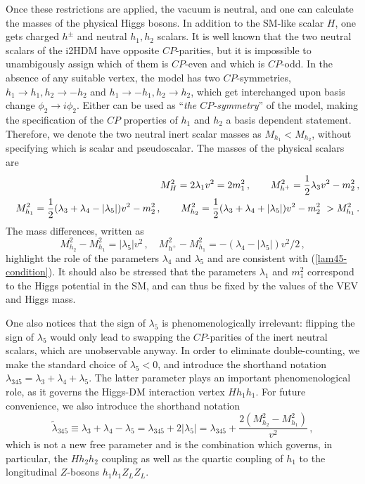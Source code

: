 \documentclass[12pt,a4paper]{article}
\begin{document}
Once these restrictions are applied, the vacuum is neutral, and one can calculate the masses of the physical Higgs bosons.
In addition to the SM-like scalar $H$, one gets charged $h^\pm$ and neutral $h_1, h_2$ scalars. 
It is well known that the two neutral scalars of the i2HDM have opposite $CP$-parities, but it is impossible 
to unambigously assign which of them is $CP$-even and which is $CP$-odd.
In the absence of any suitable vertex, the model has two $CP$-symmetries, $h_1 \to h_1, h_2 \to -h_2$ and
$h_1 \to -h_1, h_2 \to h_2$, which get interchanged upon basis change $\phi_2 \to i \phi_2$. 
Either can be used as ``\textit{the $CP$-symmetry}'' of the model, 
making the specification of the $CP$ properties of $h_1$ and $h_2$ a basis dependent statement. 
Therefore, we denote the two neutral inert scalar masses as $M_{h_1} < M_{h_2}$, without specifying which is scalar and pseudoscalar.
The masses of the physical scalars are 
\begin{eqnarray}
&&M_H^2 = 2 \lambda_1 v^2 = 2m_1^2\,,\qquad
M_{h^+}^2 = {1\over 2} \lambda_3 v^2 - m_2^2\,,\nonumber\\
&&M_{h_1}^2 = {1\over 2}(\lambda_3 +\lambda_4 - |\lambda_5|) v^2 - m_2^2\,,\qquad
M_{h_2}^2 = {1\over 2}(\lambda_3 +\lambda_4 + |\lambda_5|) v^2 - m_2^2 \ >M_{h_1}^2\,.\label{masses}
\end{eqnarray}
The mass differences, written as
\begin{equation}
M_{h_2}^2 - M_{h_1}^2 = |\lambda_5| v^2\,,\quad 
M_{h^+}^2 - M_{h_1}^2 = -(\lambda_4 - |\lambda_5|) v^2/2\,,
\end{equation}
highlight the role of the parameters $\lambda_4$ and $\lambda_5$ and are consistent with (\ref{lam45-condition}).
It should also be stressed that the parameters $\lambda_1$ and $m_1^2$ correspond to the Higgs potential in the SM, and can thus be fixed by the values of the VEV and Higgs mass.

One also notices that the sign of $\lambda_5$ is phenomenologically irrelevant: 
flipping the sign of $\lambda_5$ would only lead to swapping the $CP$-parities
of the inert neutral scalars, which are unobservable anyway.
In order to eliminate double-counting, we make the standard choice of $\lambda_5 < 0$,
and introduce the shorthand notation $\lambda_{345}=\lambda_3+\lambda_4+\lambda_5$.
The latter parameter plays an important phenomenological role, as it governs the Higgs-DM interaction vertex $H h_1 h_1$.
For future convenience, we also introduce the shorthand notation
\begin{equation}
\tilde\lambda_{345} \equiv \lambda_3+\lambda_4-\lambda_5 = \lambda_{345} + 2|\lambda_5| = 
\lambda_{345} + \frac{2(M_{h_2}^2-M_{h_1}^2)}{v^2}\,,
\label{tildelam345}
\end{equation}
which is not a new free parameter and is the combination which governs, in particular, 
the $Hh_2h_2$ coupling as well as the quartic coupling of $h_1$ to the longitudinal $Z$-bosons
$h_1 h_1 Z_L Z_L$.
\end{document}
